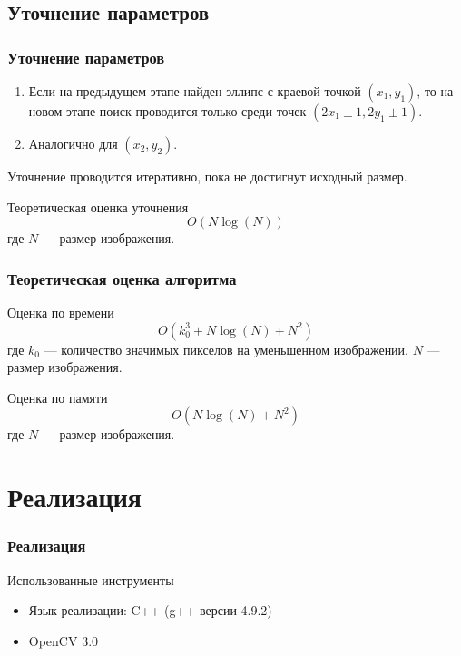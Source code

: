 \documentclass[14pt]{beamer}
\begin{document}
\subsection{Уточнение параметров}
\begin{frame}
\frametitle{Уточнение параметров}
\begin{block}{}
\begin{enumerate}
  \item Если на предыдущем этапе найден эллипс с краевой точкой \((x_1, y_1)\), то на новом этапе поиск проводится только среди точек \((2x_1 \pm 1, 2y_1 \pm 1)\).
  \item Аналогично для \((x_2, y_2)\).
\end{enumerate}
\end{block}
Уточнение проводится итеративно, пока не достигнут исходный размер.
\begin{block}{Теоретическая оценка уточнения}
$$O(N\log(N))$$ где $N$ --- размер изображения.
\end{block}
\end{frame}


\begin{frame}
\frametitle{Теоретическая оценка алгоритма}
\begin{block}{Оценка по времени}
$$O(k_0^3 + N\log(N) + N^2)$$ где $k_0$ --- количество значимых пикселов на уменьшенном изображении, $N$ --- размер изображения.
\end{block}
\begin{block}{Оценка по памяти}
$$O(N\log(N) + N^2)$$ где $N$ --- размер изображения.
\end{block}
\end{frame}

\section{Реализация}
\begin{frame}
\frametitle{Реализация}
\begin{block}{Использованные инструменты}
\begin{itemize}
  \item Язык реализации: C++ (g++ версии 4.9.2)
  \item OpenCV 3.0
\end{itemize}
\end{block}
\end{frame}
\end{document}
